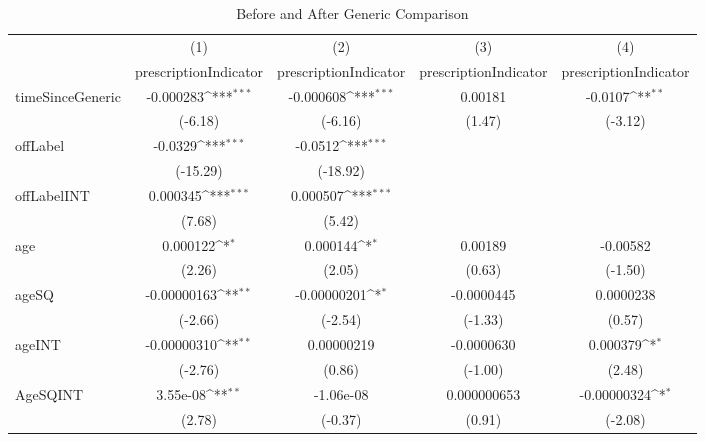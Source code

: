 \begin{table}[htbp]\centering
\def\sym#1{\ifmmode^{#1}\else\(^{#1}\)\fi}
\caption{Before and After Generic Comparison\label{tab1}}
\begin{tabular}{l*{4}{c}}
\hline\hline
            &\multicolumn{1}{c}{(1)}&\multicolumn{1}{c}{(2)}&\multicolumn{1}{c}{(3)}&\multicolumn{1}{c}{(4)}\\
            &\multicolumn{1}{c}{prescriptionIndicator}&\multicolumn{1}{c}{prescriptionIndicator}&\multicolumn{1}{c}{prescriptionIndicator}&\multicolumn{1}{c}{prescriptionIndicator}\\
\hline
timeSinceGeneric&   -0.000283\sym{***}&   -0.000608\sym{***}&     0.00181         &     -0.0107\sym{**} \\
            &     (-6.18)         &     (-6.16)         &      (1.47)         &     (-3.12)         \\
[1em]
offLabel    &     -0.0329\sym{***}&     -0.0512\sym{***}&                     &                     \\
            &    (-15.29)         &    (-18.92)         &                     &                     \\
[1em]
offLabelINT &    0.000345\sym{***}&    0.000507\sym{***}&                     &                     \\
            &      (7.68)         &      (5.42)         &                     &                     \\
[1em]
age         &    0.000122\sym{*}  &    0.000144\sym{*}  &     0.00189         &    -0.00582         \\
            &      (2.26)         &      (2.05)         &      (0.63)         &     (-1.50)         \\
[1em]
ageSQ       & -0.00000163\sym{**} & -0.00000201\sym{*}  &  -0.0000445         &   0.0000238         \\
            &     (-2.66)         &     (-2.54)         &     (-1.33)         &      (0.57)         \\
[1em]
ageINT      & -0.00000310\sym{**} &  0.00000219         &  -0.0000630         &    0.000379\sym{*}  \\
            &     (-2.76)         &      (0.86)         &     (-1.00)         &      (2.48)         \\
[1em]
AgeSQINT    &    3.55e-08\sym{**} &   -1.06e-08         & 0.000000653         & -0.00000324\sym{*}  \\
            &      (2.78)         &     (-0.37)         &      (0.91)         &     (-2.08)         \\

\end{tabular}
\end{table}
